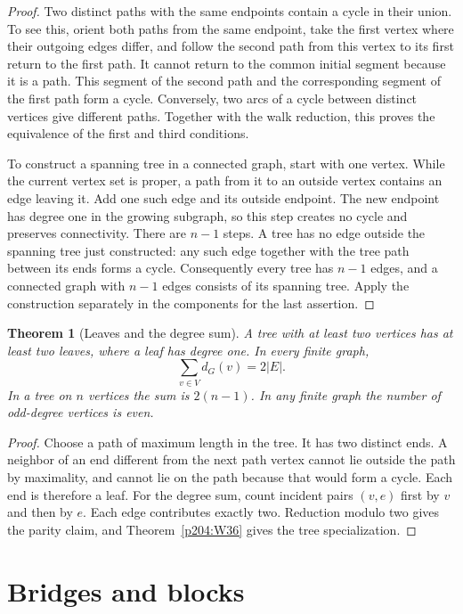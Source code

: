 \documentclass[11pt,oneside,openany]{book}
\theoremstyle{plain}
\newtheorem{theorem}{Theorem}[chapter]
\theoremstyle{definition}
\theoremstyle{remark}
\begin{document}
\begin{proof}
Two distinct paths with the same endpoints contain a cycle in their
union. To see this, orient both paths from the same endpoint, take the
first vertex where their outgoing edges differ, and follow the second
path from this vertex to its first return to the first path. It cannot
return to the common initial segment because it is a path. This segment
of the second path and the corresponding segment of the first path
form a cycle. Conversely, two arcs of a cycle between distinct vertices
give different paths. Together with the walk reduction, this proves
the equivalence of the first and third conditions.

To construct a spanning tree in a connected graph, start with one
vertex. While the current vertex set is proper, a path from it to an
outside vertex contains an edge leaving it. Add one such edge and its
outside endpoint. The new endpoint has degree one in the growing
subgraph, so this step creates no cycle and preserves connectivity.
There are \(n-1\) steps. A tree has no edge outside the spanning tree
just constructed: any such edge together with the tree path between its
ends forms a cycle. Consequently every tree has \(n-1\) edges, and a
connected graph with \(n-1\) edges consists of its spanning tree.
Apply the construction separately in the components for the last
assertion.
\end{proof}

\begin{theorem}[Leaves and the degree sum]\label{p204:W37}
A tree with at least two vertices has at least two leaves, where a leaf
has degree one. In every finite graph,
\[
  \sum_{v\in V}d_G(v)=2|E|.
\]
In a tree on \(n\) vertices the sum is \(2(n-1)\). In any finite graph
the number of odd-degree vertices is even.
\end{theorem}

\begin{proof}
Choose a path of maximum length in the tree. It has two distinct ends.
A neighbor of an end different from the next path vertex cannot lie
outside the path by maximality, and cannot lie on the path because that
would form a cycle. Each end is therefore a leaf. For the degree sum,
count incident pairs \((v,e)\) first by \(v\) and then by \(e\). Each
edge contributes exactly two. Reduction modulo two gives the parity
claim, and Theorem~\ref{p204:W36} gives the tree specialization.
\end{proof}

\section{Bridges and blocks}
\end{document}
